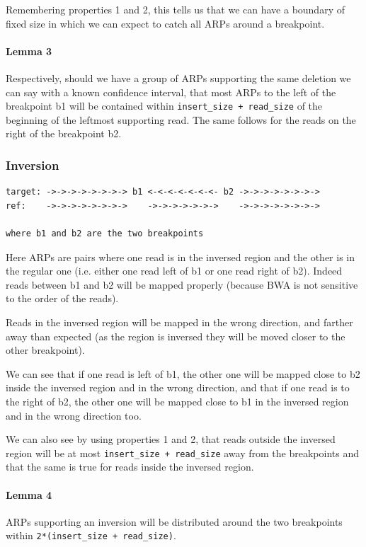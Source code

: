 \documentclass{article}
\begin{document}
Remembering properties 1 and 2, this tells us that we can have a boundary of fixed size in which
we can expect to catch all ARPs around a breakpoint.

\paragraph{Lemma 3} Respectively, should we have a group of ARPs supporting the same deletion we can say with a known confidence interval, that most ARPs to the left of the breakpoint b1 will be contained within \verb|insert_size + read_size| of the beginning of the leftmost supporting read. The same follows for the reads on the right of the breakpoint b2.

\subsubsection{Inversion} 

\begin{verbatim}
target: ->->->->->->->-> b1 <-<-<-<-<-<-<- b2 ->->->->->->->->
ref:    ->->->->->->->->    ->->->->->->->    ->->->->->->->->

where b1 and b2 are the two breakpoints
\end{verbatim}

Here ARPs are pairs where one read is in the inversed region and the other
is in the regular one (i.e. either one read left of b1 or one read right of b2). Indeed reads
between b1 and b2 will be mapped properly (because BWA is not sensitive to the order of the reads).

Reads in the inversed region will be mapped in the wrong direction, and farther away
than expected (as the region is inversed they will be moved closer to the other breakpoint).

We can see that if one read is left of b1, the other one will be mapped close to
b2 inside the inversed region and in the wrong direction, and that if one read is to the right
of b2, the other one will be mapped close to b1 in the inversed region and in the wrong direction
too.

We can also see by using properties 1 and 2, that reads outside the inversed region will be at most
\verb|insert_size + read_size| away from the breakpoints and that the same is true for reads inside
the inversed region.

\paragraph{Lemma 4} ARPs supporting an inversion will be distributed around the two
breakpoints within \verb|2*(insert_size + read_size)|.
\end{document}
